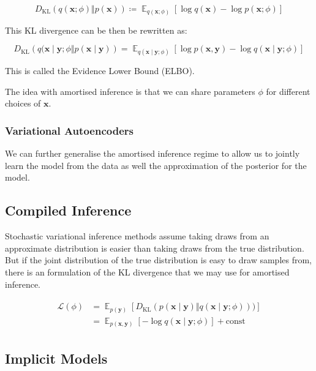 \documentclass[12pt]{article}
\DeclareMathOperator{\E}{\mathbb{E}}
\newcommand{\KL}[2]{D_{\text{KL}}\left(#1 \Vert #2\right)}
\newcommand{\given}{\mid}
\renewcommand{\vec}[1]{\boldsymbol{\mathbf{#1}}}
\theoremstyle{definition}
\begin{document}
\begin{equation}
  \KL{q(\vec x; \phi)}{p(\vec x)} \coloneqq \E_{q(\vec x; \phi)} \left[ \log q(\vec x) - \log p(\vec x; \phi) \right]
\end{equation}

This KL divergence can be then be rewritten as:

\begin{equation}
  \KL{q(\vec x \given \vec y; \phi}{p(\vec x \given \vec y)} = \E_{q(\vec x \given \vec y; \phi)} \left[ \log p(\vec x, \vec y) - \log q(\vec x \given \vec y; \phi) \right]
\end{equation}

This is called the Evidence Lower Bound (ELBO).

The idea with amortised inference \citep{gershman2014amortized} is that we can share parameters $\phi$ for different choices of $\vec x$.

\subsubsection{Variational Autoencoders}

We can further generalise the amortised inference regime to allow us to
jointly learn the model from the data as well the approximation of
the posterior for the model.

\subsection{Compiled Inference}

Stochastic variational inference methods assume taking draws from an
approximate distribution is easier than taking draws from the true
distribution. But if the joint distribution of the true distribution
is easy to draw samples from, there is an formulation of the KL
divergence that we may use for amortised inference.

\begin{align}
  \begin{split}
    \mathcal{L}(\phi) & = \E_{p(\mathbf{y})}\left[\KL{p(\vec x \given \vec y)}{q(\vec x \given \vec y; \phi)})\right] \\
    & = \E_{p(\vec x, \vec y)} \left[-\log q(\vec x \given \vec y; \phi)\right] + \text{const}
  \end{split}
\end{align}

\subsection{Implicit Models}
\end{document}
